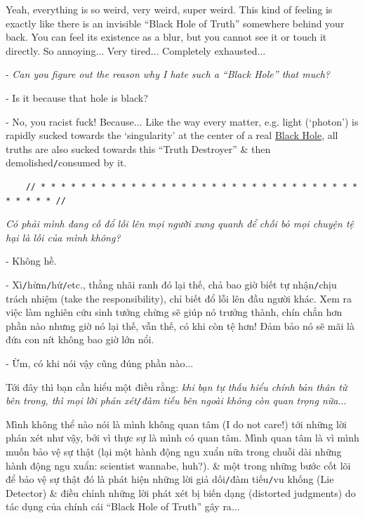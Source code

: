 \documentclass[12pt]{article}
\begin{document}
Yeah, everything is so weird, very weird, super weird. This kind of feeling is exactly like there is an invisible ``Black Hole of Truth'' somewhere behind your back. You can feel its existence as a blur, but you cannot see it or touch it directly. So annoying$\ldots$ Very tired$\ldots$ Completely exhausted$\ldots$

- {\it Can you figure out the reason why I hate such a ``Black Hole'' that much?}

- Is it because that hole is black?

- No, you racist fuck! Because$\ldots$ Like the way every matter, e.g. light (`photon') is rapidly sucked towards the `singularity' at the center of a real \href{https://en.wikipedia.org/wiki/Black_hole}{Black Hole}, all truths are also sucked towards this ``Truth Destroyer'' \& then demolished{\tt/}consumed by it.

\begin{verbatim}
	// * * * * * * * * * * * * * * * * * * * * * * * * * * * * * * * * * * * * * //
\end{verbatim}

\noindent
{} {\it Có phải mình đang cố đổ lỗi lên mọi người xung quanh để chối bỏ mọi chuyện tệ hại là lỗi của mình không?}

- Không hề.

- Xì{\tt/}hừm{\tt/}hứ{\tt/}etc., thằng nhãi ranh đó lại thế, chả bao giờ biết tự nhận{\tt/}chịu trách nhiệm (take the responsibility), chỉ biết đổ lỗi lên đầu người khác. Xem ra việc làm nghiên cứu sinh tưởng chừng sẽ giúp nó trưởng thành, chín chắn hơn phần nào nhưng giờ nó lại thế, vẫn thế, có khi còn tệ hơn! Đảm bảo nó sẽ mãi là đứa con nít không bao giờ lớn nổi.

- Ừm, có khi nói vậy cũng đúng phần nào$\ldots$

Tới đây thì bạn cần hiểu một điều rằng: {\it khi bạn tự thấu hiểu chính bản thân từ bên trong, thì mọi lời phán xét{\tt/}đàm tiếu bên ngoài không còn quan trọng nữa}$\ldots$

Mình không thể nào nói là mình không quan tâm (I do not care!) tới những lời phán xét như vậy, bởi vì thực sự là mình có quan tâm. Mình quan tâm là vì mình muốn bảo vệ sự thật (lại một hành động ngu xuẩn nữa trong chuỗi dài những hành động ngu xuẩn: scientist wannabe, huh?). \& một trong những bước cốt lõi để bảo vệ sự thật đó là phát hiện những lời giả dối{\tt/}đàm tiếu{\tt/}vu khống (Lie Detector) \& điều chỉnh những lời phát xét bị biến dạng (distorted judgments) do tác dụng của chính cái ``Black Hole of Truth'' gây ra$\ldots$
\end{document}

